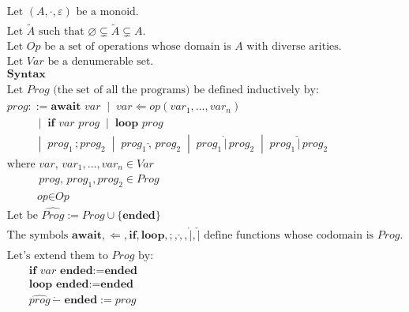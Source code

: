 \begin{align*}
&\text{Let } (A, \cdot, \varepsilon) \text{ be a monoid.}\\
&\text{Let } \tilde{A} \text{ such that } \varnothing \subsetneq \tilde{A} \subsetneq A \text{.}\\
&\text{Let } \textit{Op} \text{ be a set of operations whose domain is } A \text{ with diverse arities.}\\
&\text{Let } \textit{Var} \text{ be a denumerable set.}\\
&\textbf{Syntax}\\
&\text{Let } \textit{Prog} \text{ (the set of all the programs) be defined inductively by:}\\
&\textit{prog} ::= \textbf{await } \textit{var}
\;\;|\;\; \textit{var} \boldsymbol\Leftarrow \textit{op}(var_1,\dots,var_n)\\
&\qquad\;\;\;|\;\; \textbf{if } \textit{var } \textit{prog}
\;\;|\;\; \textbf{loop } \textit{prog} \\
&\qquad\;\;\;|\;\; \textit{prog}_1\,\boldsymbol;\textit{prog}_2
\;\;|\;\; \textit{prog}_1\,\boldsymbol{\check{,}}\,\textit{prog}_2
\;\;|\;\; \textit{prog}_1\,\boldsymbol{\dot{|}}\,\textit{prog}_2
\;\;|\;\; \textit{prog}_1\,\boldsymbol{\check{|}}\,\textit{prog}_2\\
&\text{where} \textit{ var, }var_1,\dots,var_n \in \textit{Var}\\
&\qquad\;\;\textit{ prog, }prog_1, prog_2 \in \textit{Prog}\\
&\qquad\;\;\,\textit{op} \in \textit{Op}\\
&\text{Let be } \widehat{Prog} := \textit{Prog} \cup \{\textbf{ended}\}\\
&\text{The symbols } \textbf{await}, \boldsymbol\Leftarrow, \textbf{if}, \textbf{loop}, \boldsymbol;, \boldsymbol{\check{,}}, \boldsymbol{\dot{|}}, \boldsymbol{\check{|}} \text{ define functions whose codomain is }\textit{Prog.}\\
&\text{Let's extend them to }\widehat{Prog} \text{ by:}\\
&\qquad\textbf{if } \textit{var }\textbf{ended} := \textbf{ended}\\
&\qquad\textbf{loop } \textbf{ended} := \textbf{ended}\\
&\qquad\widehat{\textit{prog}}\,\boldsymbol{\dot{\boldsymbol-}}\textbf{ ended} := \textit{prog}\\

\end{align*}
